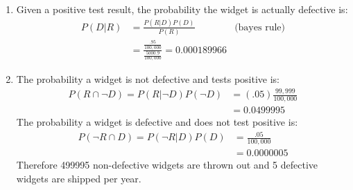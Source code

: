 \documentclass{report}
\begin{document}
\begin{enumerate}
	     
	    \begin{enumerate}[label=(\alph*)]
		\item Given a positive test result, the probability the widget is actually defective is:
	 	\begin{align*}
	 	 P(D \vert R)	&= \frac{P(R \vert D)P(D)}{P(R)} & \text{(bayes rule)} \\
	 	 				&= \frac{\frac{.95}{100,000}}{\frac{5000.9}{100,000}}
	 	 				 = \mathbf{0.000189966}
	    \end{align*}
		\item The probability a widget is not defective and tests positive is:
		\begin{align*}
		P(R \cap \lnot D) = P(R \vert \lnot D)P(\lnot D) 	&= (.05)\frac{99,999}{100,000} \\
															&= 0.0499995
		\end{align*}
		The probability a widget is defective and does not test positive is:
		\begin{align*}
		P(\lnot R \cap D) = P(\lnot R \vert  D)P(D) 	&= \frac{.05}{100,000} \\
														&= 0.0000005
		\end{align*}
		Therefore 499995 non-defective widgets are thrown out and 5 defective widgets are shipped per year.
		\end{enumerate}
		
\end{enumerate}
\end{document}

